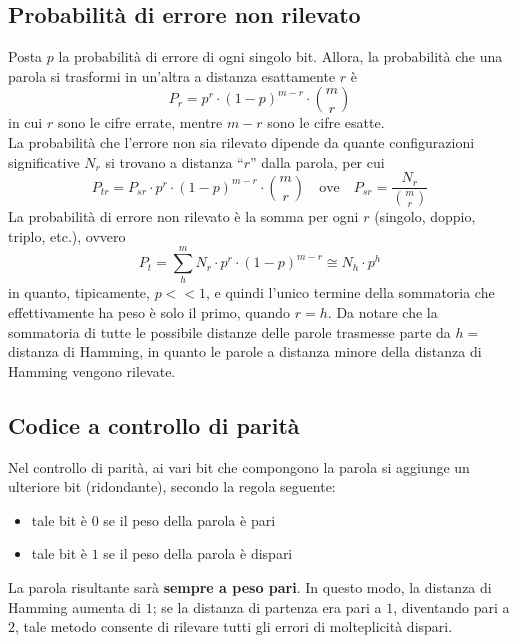 \documentclass[a4paper]{extarticle}
\newcommand{\quotes}[1]{``#1''}
\begin{document}
\vspace{1em}
\noindent
\subsection{Probabilità di errore non rilevato}
Posta $p$ la probabilità di errore di ogni singolo bit. Allora, la probabilità che una parola si trasformi in un'altra a distanza esattamente $r$ è
\[P_r = p^r \cdot (1-p)^{m-r} \cdot \binom{m}{r}\]
in cui $r$ sono le cifre errate, mentre $m-r$ sono le cifre esatte.\\
La probabilità che l'errore non sia rilevato dipende da quante configurazioni significative $N_r$ si trovano a distanza \quotes{$r$} dalla parola, per cui
\[P_{tr} = P_{sr} \cdot p^r \cdot (1-p)^{m-r} \cdot \binom{m}{r} \hspace{1em} \text{ove} \hspace{1em} P_{sr} = \dfrac{N_r}{\displaystyle{\binom{m}{r}}}\]
La probabilità di errore non rilevato è la somma per ogni $r$ (singolo, doppio, triplo, etc.), ovvero
\[P_t = \sum_h^m N_r \cdot p^r \cdot (1-p)^{m-r} \cong N_h \cdot p^h\]
in quanto, tipicamente, $p<<1$, e quindi l'unico termine della sommatoria che effettivamente ha peso è solo il primo, quando $r=h$. Da notare che la sommatoria di tutte le possibile distanze delle parole trasmesse parte da $h=$ distanza di Hamming, in quanto le parole a distanza minore della distanza di Hamming vengono rilevate.

\vspace{1em}
\noindent
\subsection{Codice a controllo di parità}
Nel controllo di parità, ai vari bit che compongono la parola si aggiunge un ulteriore bit (ridondante), secondo la regola seguente:
\begin{itemize}
    \item tale bit è $0$ se il peso della parola è pari
    \item tale bit è $1$ se il peso della parola è dispari
\end{itemize}
La parola risultante sarà \textbf{sempre a peso pari}. In questo modo, la distanza di Hamming aumenta di $1$; se la distanza di partenza era pari a $1$, diventando pari a $2$, tale metodo consente di rilevare tutti gli errori di molteplicità dispari.
\end{document}
